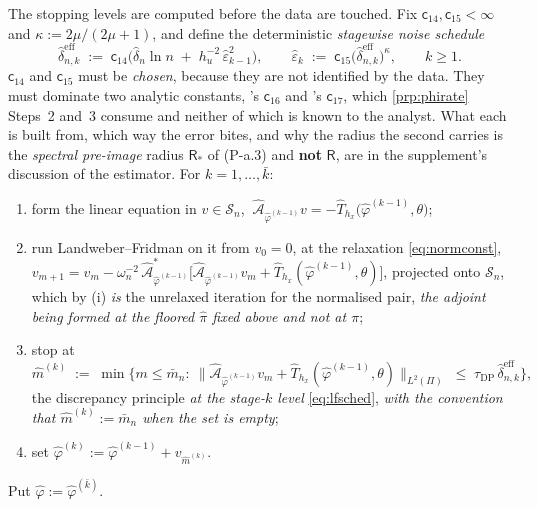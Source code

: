 \begin{definition}
The stopping levels are computed before the data are touched. Fix $\mathsf c_{14},\mathsf c_{15}<\infty$
and $\kappa:=2\mu/(2\mu+1)$, and define the deterministic \emph{stagewise noise schedule}
\begin{equation}\label{eq:lfsched}
\hat\delta^{\mathrm{eff}}_{n,k}\;:=\;\mathsf c_{14}\Big(\hat\delta_n\ln n\;+\;h_u^{-2}\,\hat\varepsilon_{k-1}^{2}\Big),
\qquad
\hat\varepsilon_{k}\;:=\;\mathsf c_{15}\big(\hat\delta^{\mathrm{eff}}_{n,k}\big)^{\kappa},
\qquad k\ge1 .
\end{equation}
$\mathsf c_{14}$ and $\mathsf c_{15}$ must be
\emph{chosen}, because they are not identified by the data.
They must dominate two analytic
constants, 's $\mathsf c_{16}$ and 's $\mathsf c_{17}$, which
\cref{prp:phirate} Steps~2 and~3 consume and neither of which is known to the analyst. What each is
built from, which way the error bites, and why the radius the second carries is the \emph{spectral
pre-image} radius $\mathsf R_\ast$ of (P-a.3) and \textbf{not} $\mathsf R$, are in the supplement's
discussion of the estimator. For $k=1,\dots,\bar k$:
\begin{enumerate}
\item[(a)] form the linear equation in $v\in\mathcal S_n$,
$\ \hat{\mathcal A}_{\hat\varphi^{(k-1)}}v=-\hat T_{h_x}\big(\hat\varphi^{(k-1)},\theta\big)$;
\item[(b)] run Landweber--Fridman on it from $v_0=0$, at the relaxation \eqref{eq:normconst},
$v_{m+1}=v_m-\omega_n^{-2}\,\hat{\mathcal A}^\ast_{\hat\varphi^{(k-1)}}\big[\hat{\mathcal A}_{\hat\varphi^{(k-1)}}v_m
+\hat T_{h_x}(\hat\varphi^{(k-1)},\theta)\big]$, projected onto $\mathcal S_n$, which by
(i) \emph{is} the unrelaxed iteration for the normalised pair, \emph{the
adjoint being formed at the floored $\hat\pi$ fixed above and not at $\pi$};
\item[(c)] stop at
\[
\hat m^{(k)}\;:=\;\min\Big\{m\le\bar m_n:\ \big\|\hat{\mathcal A}_{\hat\varphi^{(k-1)}}v_m
+\hat T_{h_x}(\hat\varphi^{(k-1)},\theta)\big\|_{L^{2}(\Pi)}\;\le\;
\tau_{\mathrm{DP}}\,\hat\delta^{\mathrm{eff}}_{n,k}\Big\},
\]
the discrepancy principle \emph{at the stage-$k$ level} \eqref{eq:lfsched}, \emph{with the convention
that $\hat m^{(k)}:=\bar m_n$ when the set is empty};
\item[(d)] set $\hat\varphi^{(k)}:=\hat\varphi^{(k-1)}+v_{\hat m^{(k)}}$.
\end{enumerate}
Put $\hat\varphi:=\hat\varphi^{(\bar k)}$.


\end{definition}
